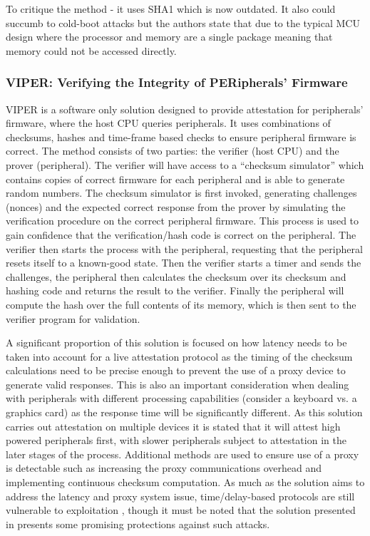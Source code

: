 To critique the method - it uses SHA1 which is now outdated. It also could succumb to cold-boot attacks but the authors state that due to the typical MCU design where the processor and memory are a single package meaning that memory could not be accessed directly.

\subsubsection{VIPER: Verifying the Integrity of PERipherals’ Firmware}

VIPER \cite{Li2011} is a software only solution designed to provide attestation for peripherals’ firmware, where the host CPU queries peripherals. It uses combinations of checksums, hashes and time-frame based checks to ensure peripheral firmware is correct. The method consists of two parties: the verifier (host CPU) and the prover (peripheral). The verifier will have access to a ``checksum simulator'' which contains copies of correct firmware for each peripheral and is able to generate random numbers. The checksum simulator is first invoked, generating challenges (nonces) and the expected correct response from the prover by simulating the verification procedure on the correct peripheral firmware. This process is used to gain confidence that the verification\slash hash code is correct on the peripheral. The verifier then starts the process with the peripheral, requesting that the peripheral resets itself to a known-good state. Then the verifier starts a timer and sends the challenges, the peripheral then calculates the checksum over its checksum and hashing code and returns the result to the verifier. Finally the peripheral will compute the hash over the full contents of its memory, which is then sent to the verifier program for validation.

A significant proportion of this solution is focused on how latency needs to be taken into account for a live attestation protocol as the timing of the checksum calculations need to be precise enough to prevent the use of a proxy device to generate valid responses. This is also an important consideration when dealing with peripherals with different processing capabilities (consider a keyboard vs. a graphics card) as the response time will be significantly different. As this solution carries out attestation on multiple devices it is stated that it will attest high powered peripherals first, with slower peripherals subject to attestation in the later stages of the process. Additional methods are used to ensure use of a proxy is detectable such as increasing the proxy communications overhead and implementing continuous checksum computation. As much as the solution aims to address the latency and proxy system issue, time\slash delay-based protocols are still vulnerable to exploitation \cite{Castelluccia2009}, though it must be noted that the solution presented in \cite{Li2011} presents some promising protections against such attacks.

